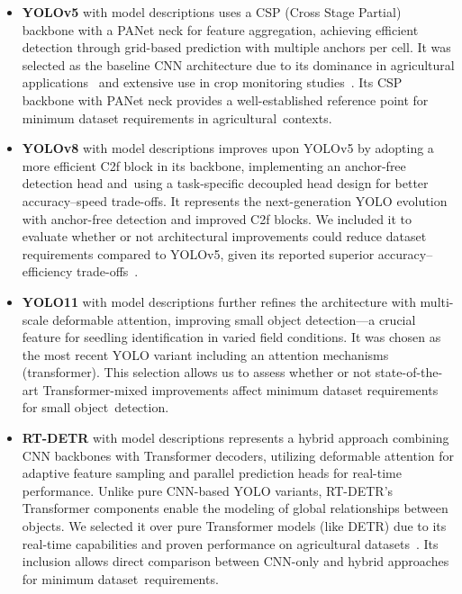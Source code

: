 \documentclass[12pt,a4paper,oneside]{report}
\begin{document}
\begin{itemize}
  \item \textbf{YOLOv5} %
  with model descriptions uses a CSP (Cross Stage Partial) backbone with a PANet neck 
  for feature aggregation, achieving efficient detection through grid-based prediction 
  with multiple anchors per cell. It was selected as the baseline CNN architecture due to its 
  dominance in agricultural applications~\cite{badgujarAgriculturalObjectDetection2024} 
  and extensive use in crop monitoring studies~\cite{kitanoCornPlantCounting2019,
  barretoAutomaticUAVbasedCounting2021}. Its CSP backbone with PANet neck provides 
  a well-established reference point for minimum dataset requirements in 
  agricultural~contexts.
  
  \item \textbf{YOLOv8} %
  with model descriptions improves upon YOLOv5 by adopting a more efficient C2f block 
  in its backbone, implementing an anchor-free detection head and~using a task-specific 
  decoupled head design for better accuracy--speed trade-offs. It represents the next-generation YOLO evolution with 
  anchor-free detection and improved C2f blocks. We included it to evaluate 
  whether or not architectural improvements could reduce dataset requirements compared 
  to YOLOv5, given its reported superior accuracy--efficiency trade-offs~\cite{tervenComprehensiveReviewYOLO2023}.
  
  \item \textbf{YOLO11} %
  with model descriptions further refines the architecture with multi-scale deformable 
  attention, improving small object detection—a crucial feature for seedling 
  identification in varied field conditions. It was chosen as the most recent YOLO 
  variant including an attention mechanisms (transformer). This selection allows us to 
  assess whether or not state-of-the-art Transformer-mixed improvements affect minimum dataset 
  requirements for small object~detection.
  
  \item \textbf{RT-DETR} %
  with model descriptions represents a hybrid approach combining CNN backbones with 
  Transformer decoders, utilizing deformable attention for adaptive feature sampling 
  and parallel prediction heads for real-time performance. Unlike pure CNN-based YOLO 
  variants, RT-DETR's Transformer components enable the modeling of global relationships 
  between objects. We selected 
  it over pure Transformer models (like DETR) due to its real-time capabilities 
  and proven performance on agricultural datasets~\cite{zhaoDETRsBeatYOLOs2024}. 
  Its inclusion allows direct comparison between CNN-only and hybrid approaches 
  for minimum dataset~requirements.
\end{itemize}
\end{document}
